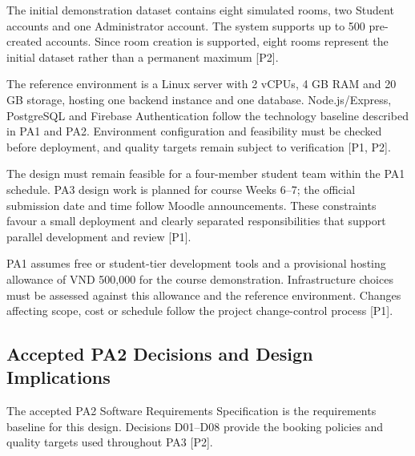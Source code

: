 The initial demonstration dataset contains eight simulated rooms, two Student accounts and one Administrator account. The system supports up to 500 pre-created accounts. Since room creation is supported, eight rooms represent the initial dataset rather than a permanent maximum [P2].

The reference environment is a Linux server with 2 vCPUs, 4 GB RAM and 20 GB storage, hosting one backend instance and one database. Node.js/Express, PostgreSQL and Firebase Authentication follow the technology baseline described in PA1 and PA2. Environment configuration and feasibility must be checked before deployment, and quality targets remain subject to verification [P1, P2].

The design must remain feasible for a four-member student team within the PA1 schedule. PA3 design work is planned for course Weeks 6--7; the official submission date and time follow Moodle announcements. These constraints favour a small deployment and clearly separated responsibilities that support parallel development and review [P1].

PA1 assumes free or student-tier development tools and a provisional hosting allowance of VND 500,000 for the course demonstration. Infrastructure choices must be assessed against this allowance and the reference environment. Changes affecting scope, cost or schedule follow the project change-control process [P1].

\subsection{Accepted PA2 Decisions and Design Implications}

The accepted PA2 Software Requirements Specification is the requirements baseline for this design. Decisions D01--D08 provide the booking policies and quality targets used throughout PA3 [P2].

